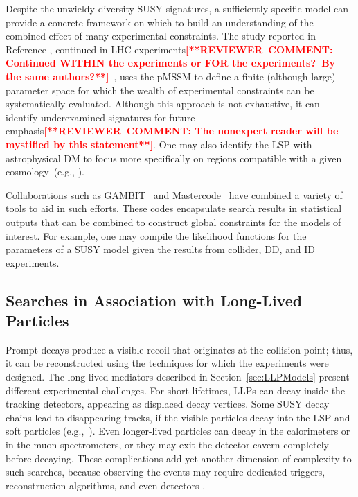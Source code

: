 \documentclass{ar-1col}
\begin{document}
Despite the unwieldy diversity SUSY signatures, a sufficiently
specific model can provide a concrete framework on which to build
an understanding of the combined effect of many experimental
constraints. The study reported in Reference , continued in LHC
experiments\textbf{\textcolor{red}{[**REVIEWER\ COMMENT: Continued WITHIN the experiments or FOR the experiments?\ By the same authors?**]}}~\cite{Aad:2015baa, Khachatryan:2016nvf}, uses the
pMSSM to define a finite (although large) parameter space for
which the wealth of experimental constraints can be systematically
evaluated. Although this approach is not exhaustive, it can identify
underexamined signatures for future emphasis\textbf{\textcolor{red}{[**REVIEWER\ COMMENT: The nonexpert reader will be mystified by this statement**]}}. One may also identify the LSP with astrophysical DM
to focus more specifically on regions compatible with a given
cosmology~(e.g., ).

Collaborations such as GAMBIT~\cite{Athron:2017ard} and
Mastercode~\cite{Bagnaschi:2017tru} have combined a variety of
tools to aid in such efforts. These codes encapsulate search
results in statistical outputs that can be combined to construct
global constraints for the models of interest. For example, one
may compile the likelihood functions for the parameters of a SUSY
model given the results from collider, DD, and ID experiments.

\subsection{Searches in Association with Long-Lived Particles}\label{sec:results_LLPSearches}

Prompt decays produce a visible recoil that originates at the collision
point; thus, it can be reconstructed using the techniques for
which the experiments were designed. The long-lived mediators
described in Section~\ref{sec:LLPModels} present different
experimental challenges. For short lifetimes, LLPs can decay inside the tracking detectors, appearing as
displaced decay vertices. Some SUSY decay chains lead to
disappearing tracks, if the visible particles decay into the LSP
and soft particles (e.g.,~).
Even longer-lived particles can decay in the calorimeters or in
the muon spectrometers, or they may exit the detector cavern
completely before decaying. These complications add yet another
dimension of complexity to such searches, because observing the
events may require dedicated triggers, reconstruction algorithms,
and even detectors \cite{Ball:2016zrp,Chou:2016lxi}.
\end{document}
